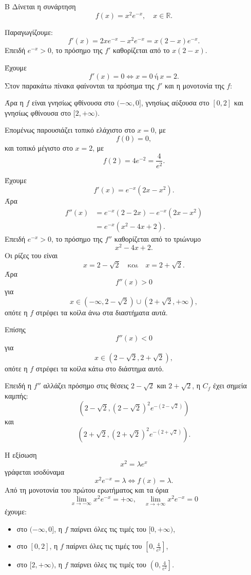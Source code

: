 \begin{thema}{Β}
Δίνεται η συνάρτηση
\[
f(x)=x^2e^{-x},\quad x\in\mathbb{R}.
\]
\begin{erwthma}
\item Παραγωγίζουμε:
\[
f'(x)=2xe^{-x}-x^2e^{-x}=x(2-x)e^{-x}.
\]
Επειδή $e^{-x}>0$, το πρόσημο της $f'$ καθορίζεται από το $x(2-x)$.

Έχουμε
\[
f'(x)=0\Leftrightarrow x=0\ \text{ή}\ x=2.
\]
Στον παρακάτω πίνακα φαίνονται τα πρόσημα της $f'$ και η μονοτονία της $f$:
\begin{center}
\end{center}

Άρα η $f$ είναι γνησίως φθίνουσα στο $(-\infty,0]$, γνησίως αύξουσα στο $[0,2]$ και γνησίως φθίνουσα στο $[2,+\infty)$.

Επομένως παρουσιάζει τοπικό ελάχιστο στο $x=0$, με
\[
f(0)=0,
\]
και τοπικό μέγιστο στο $x=2$, με
\[
f(2)=4e^{-2}=\frac{4}{e^2}.
\]

\item Έχουμε
\[
f'(x)=e^{-x}(2x-x^2).
\]
Άρα
\begin{align*}
f''(x)
&=e^{-x}(2-2x)-e^{-x}(2x-x^2)\\
&=e^{-x}(x^2-4x+2).
\end{align*}
Επειδή $e^{-x}>0$, το πρόσημο της $f''$ καθορίζεται από το τριώνυμο
\[
x^2-4x+2.
\]
Οι ρίζες του είναι
\[
x=2-\sqrt2
\quad\text{και}\quad
x=2+\sqrt2.
\]
Άρα
\[
f''(x)>0
\]
για
\[
x\in(-\infty,2-\sqrt2)\cup(2+\sqrt2,+\infty),
\]
οπότε η $f$ στρέφει τα κοίλα άνω στα διαστήματα αυτά.

Επίσης
\[
f''(x)<0
\]
για
\[
x\in(2-\sqrt2,2+\sqrt2),
\]
οπότε η $f$ στρέφει τα κοίλα κάτω στο διάστημα αυτό.

Επειδή η $f''$ αλλάζει πρόσημο στις θέσεις $2-\sqrt2$ και $2+\sqrt2$, η $C_f$ έχει σημεία καμπής:
\[
\left(2-\sqrt2,(2-\sqrt2)^2e^{-(2-\sqrt2)}\right)
\]
και
\[
\left(2+\sqrt2,(2+\sqrt2)^2e^{-(2+\sqrt2)}\right).
\]

\item Η εξίσωση
\[
x^2=\lambda e^x
\]
γράφεται ισοδύναμα
\[
x^2e^{-x}=\lambda
\Leftrightarrow
f(x)=\lambda.
\]
Από τη μονοτονία του πρώτου ερωτήματος και τα όρια
\[
\lim_{x\to-\infty}x^2e^{-x}=+\infty,
\quad
\lim_{x\to+\infty}x^2e^{-x}=0
\]
έχουμε:
\begin{itemize}
\item στο $(-\infty,0]$, η $f$ παίρνει όλες τις τιμές του $[0,+\infty)$,
\item στο $[0,2]$, η $f$ παίρνει όλες τις τιμές του $\left[0,\frac{4}{e^2}\right]$,
\item στο $[2,+\infty)$, η $f$ παίρνει όλες τις τιμές του $\left(0,\frac{4}{e^2}\right]$.
\end{itemize}


\end{erwthma}
\end{thema}
